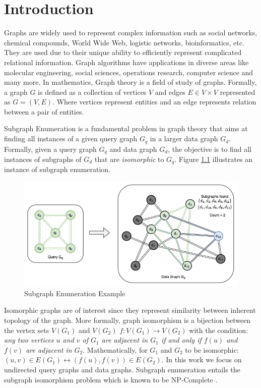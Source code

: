 \chapter{Introduction}\label{chap:Intro}

Graphs are widely used to represent complex information such as social networks, chemical compounds, World Wide Web, logistic networks, bioinformatics, etc.
They are used due to their unique ability to efficiently represent complicated relational information.
Graph algorithms have applications in diverse areas like molecular engineering, social sciences, operations research, computer science and many more.
In mathematics, Graph theory is a field of study of graphs. Formally, a graph $G$ is defined as a collection of vertices $V$ and edges $E \in V \times V$ represented as $G=(V,E)$. Where vertices represent entities and an edge represents relation between a pair of entities.

Subgraph Enumeration is a fundamental problem in graph theory that aims at finding all instances of a given query graph $G_q$ in a larger data graph $G_d$.
Formally, given a query graph $G_q$ and data graph $G_d$, the objective is to find all instances of subgraphs of $G_d$ that are \textit{isomorphic} to $G_q$. Figure \ref{fig:sgm-intro} illustrates an instance of subgraph enumeration.

\begin{figure}
    \includegraphics[width=\textwidth]{fig/sgm-intro-double.png}
    \caption{Subgraph Enumeration Example}
    \label{fig:sgm-intro}
\end{figure}

Isomorphic graphs are of interest since they represent similarity between inherent topology of the graph.
More formally, graph isomorphism is a bijection between the vertex sets $V(G_1)$ and $V(G_2)$ $f: V(G_1) \rightarrow V(G_2) $ with the condition: \textit{any two vertices $u$ and $v$ of $G_1$ are adjacent in $G_1$ \textit{if and only if} $f(u)$ and $f(v)$ are adjacent in $G_2$}.
Mathematically, for $G_1$ and $G_2$ to be isomorphic: $(u,v) \in E(G_1) \leftrightarrow (f(u),f(v)) \in E(G_2)$. In this work we focus on undirected query graphs and data graphs.
Subgraph enumeration entails the subgraph isomorphism problem which is known to be NP-Complete \cite{Book:Complexity_Theory}.


